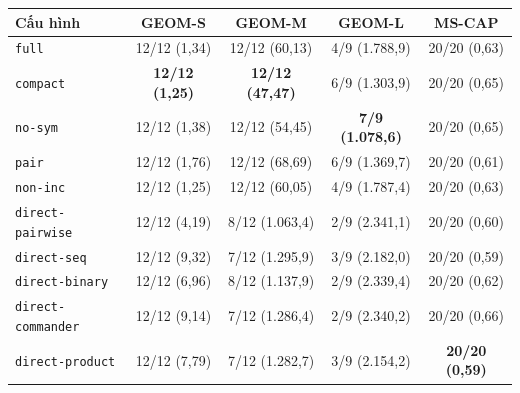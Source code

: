\begin{tabular}{lcccc}
\toprule
Cấu hình & GEOM-S & GEOM-M & GEOM-L & MS-CAP \\
\midrule
\texttt{full} & 12/12 (1,34) & 12/12 (60,13) & 4/9 (1.788,9) & 20/20 (0,63) \\
\texttt{compact} & \textbf{12/12 (1,25)} & \textbf{12/12 (47,47)} & 6/9 (1.303,9) & 20/20 (0,65) \\
\texttt{no-sym} & 12/12 (1,38) & 12/12 (54,45) & \textbf{7/9 (1.078,6)} & 20/20 (0,65) \\
\texttt{pair} & 12/12 (1,76) & 12/12 (68,69) & 6/9 (1.369,7) & 20/20 (0,61) \\
\texttt{non-inc} & 12/12 (1,25) & 12/12 (60,05) & 4/9 (1.787,4) & 20/20 (0,63) \\
\midrule
\texttt{direct-pairwise} & 12/12 (4,19) & 8/12 (1.063,4) & 2/9 (2.341,1) & 20/20 (0,60) \\
\texttt{direct-seq} & 12/12 (9,32) & 7/12 (1.295,9) & 3/9 (2.182,0) & 20/20 (0,59) \\
\texttt{direct-binary} & 12/12 (6,96) & 8/12 (1.137,9) & 2/9 (2.339,4) & 20/20 (0,62) \\
\texttt{direct-commander} & 12/12 (9,14) & 7/12 (1.286,4) & 2/9 (2.340,2) & 20/20 (0,66) \\
\texttt{direct-product} & 12/12 (7,79) & 7/12 (1.282,7) & 3/9 (2.154,2) & \textbf{20/20 (0,59)} \\
\bottomrule
\end{tabular}
